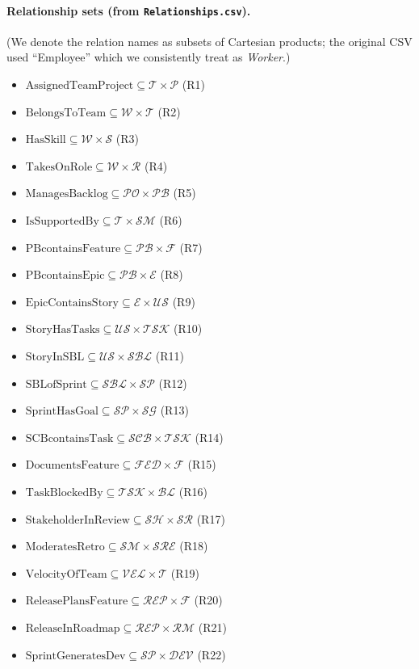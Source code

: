 \documentclass[a4paper,11pt]{article}
\begin{document}
\paragraph{Relationship sets (from \texttt{Relationships.csv}).}
(We denote the relation names as subsets of Cartesian products; the original CSV used ``Employee'' which we consistently treat as \emph{Worker}.)
\begin{itemize}[leftmargin=2em]
  \item $\mathrm{AssignedTeamProject} \subseteq \mathcal{T}\times\mathcal{P}$ \; (R1)
  \item $\mathrm{BelongsToTeam} \subseteq \mathcal{W}\times\mathcal{T}$ \; (R2)
  \item $\mathrm{HasSkill} \subseteq \mathcal{W}\times\mathcal{S}$ \; (R3)
  \item $\mathrm{TakesOnRole} \subseteq \mathcal{W}\times\mathcal{R}$ \; (R4)
  \item $\mathrm{ManagesBacklog} \subseteq \mathcal{PO}\times\mathcal{PB}$ \; (R5)
  \item $\mathrm{IsSupportedBy} \subseteq \mathcal{T}\times\mathcal{SM}$ \; (R6)
  \item $\mathrm{PBcontainsFeature} \subseteq \mathcal{PB}\times\mathcal{F}$ \; (R7)
  \item $\mathrm{PBcontainsEpic} \subseteq \mathcal{PB}\times\mathcal{E}$ \; (R8)
  \item $\mathrm{EpicContainsStory} \subseteq \mathcal{E}\times\mathcal{US}$ \; (R9)
  \item $\mathrm{StoryHasTasks} \subseteq \mathcal{US}\times\mathcal{TSK}$ \; (R10)
  \item $\mathrm{StoryInSBL} \subseteq \mathcal{US}\times\mathcal{SBL}$ \; (R11)
  \item $\mathrm{SBLofSprint} \subseteq \mathcal{SBL}\times\mathcal{SP}$ \; (R12)
  \item $\mathrm{SprintHasGoal} \subseteq \mathcal{SP}\times\mathcal{SG}$ \; (R13)
  \item $\mathrm{SCBcontainsTask} \subseteq \mathcal{SCB}\times\mathcal{TSK}$ \; (R14)
  \item $\mathrm{DocumentsFeature} \subseteq \mathcal{FED}\times\mathcal{F}$ \; (R15)
  \item $\mathrm{TaskBlockedBy} \subseteq \mathcal{TSK}\times\mathcal{BL}$ \; (R16)
  \item $\mathrm{StakeholderInReview} \subseteq \mathcal{SH}\times\mathcal{SR}$ \; (R17)
  \item $\mathrm{ModeratesRetro} \subseteq \mathcal{SM}\times\mathcal{SRE}$ \; (R18)
  \item $\mathrm{VelocityOfTeam} \subseteq \mathcal{VEL}\times\mathcal{T}$ \; (R19)
  \item $\mathrm{ReleasePlansFeature} \subseteq \mathcal{REP}\times\mathcal{F}$ \; (R20)
  \item $\mathrm{ReleaseInRoadmap} \subseteq \mathcal{REP}\times\mathcal{RM}$ \; (R21)
  \item $\mathrm{SprintGeneratesDev} \subseteq \mathcal{SP}\times\mathcal{DEV}$ \; (R22)
\end{itemize}
\end{document}
